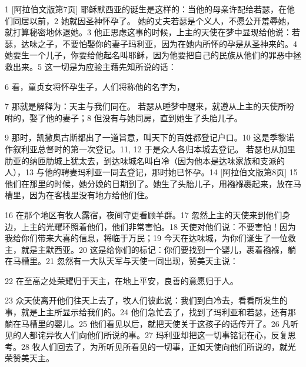 1 [阿拉伯文版第7页]  耶稣默西亚的诞生是这样的：当他的母亲许配给若瑟，在他们同居以前，2 她就因圣神怀孕了。 她的丈夫若瑟是个义人，不愿公开羞辱她，就打算秘密地休退她。3  他正思虑这事的时候，上主的天使在梦中显现给他说：若瑟，达味之子，不要怕娶你的妻子玛利亚，因为在她内所怀的孕是从圣神来的。4  她要生一个儿子，你要给他起名叫耶稣，因为他要把自己的民族从他们的罪恶中拯救出来。5  这一切是为应验主藉先知所说的话：\par

6  看，童贞女将怀孕生子，\newline{}人们将称他的名字为，\par

7 那就是解释为：天主与我们同在。 若瑟从睡梦中醒来，就遵从上主的天使所吩咐的，娶了他的妻子；8  但没有与她同房，直到她生了头胎儿子。\par

9  那时，凯撒奥古斯都出了一道旨意，叫天下的百姓都登记户口。10  这是季黎诺作叙利亚总督时的第一次登记。11, 12  于是众人各归本城去登记。 若瑟也从加里肋亚的纳匝肋城上犹太去，到达味城名叫白冷（因为他本是达味家族和支派的人），13  与他的聘妻玛利亚一同去登记，那时她已怀孕。14 [阿拉伯文版第8页]  15 他们在那里的时候，她分娩的日期到了。她生了头胎儿子，用襁褓裹起来，放在马槽里，因为在客栈里没有地方给他们住。\par

16 在那个地区有牧人露宿，夜间守更看顾羊群。17  忽然上主的天使来到他们身边，上主的光耀环照着他们，他们非常害怕。18  天使对他们说：不要害怕！因为我给你们带来大喜的信息，将临于万民；19  今天在达味城，为你们诞生了一位救主，就是主默西亚。20  这是给你们的标记：你们要找到一个婴儿，裹着襁褓，躺在马槽里。21  忽然有一大队天军与天使一同出现，赞美天主说：\par

22  在至高之处荣耀归于天主，\newline{}在地上平安，良善的意愿归于人。\par

23  众天使离开他们往天上去了，牧人们彼此说：我们到白冷去，看看所发生的事，就是上主所显示给我们的。24  他们急忙去了，找到了玛利亚和若瑟，还有那躺在马槽里的婴儿。25  他们看见以后，就把天使关于这孩子的话传开了。26  凡听见的人都诧异牧人们向他们所说的事。27  玛利亚却把这一切事铭记在心，反复思考。28  牧人们回去了，为所听见所看见的一切事，正如天使向他们所说的，就光荣赞美天主。\par

